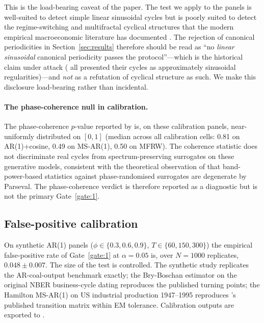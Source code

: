 This is the load-bearing caveat of the paper. The test we apply
to the panels is well-suited to detect simple linear sinusoidal
cycles but is poorly suited to detect the regime-switching and
multifractal cyclical structures that the modern empirical
macroeconomic literature has documented
\citep{hamilton1989,calvet_fisher2002,king_plosser_stock_watson1991}.
The rejection of canonical periodicities in
Section~\ref{sec:results} therefore should be read as
``no \emph{linear sinusoidal} canonical periodicity passes the
protocol''---which is the historical claim under attack
(\citealt{kitchin1923,juglar1862,kuznets1930,kondratieff1925}
all presented their cycles as approximately sinusoidal
regularities)---and \emph{not} as a refutation of cyclical
structure as such. We make this disclosure load-bearing rather
than incidental.

\paragraph{The phase-coherence null in calibration.}
The phase-coherence \(p\)-value reported by
 is, on these calibration panels,
near-uniformly distributed on \([0,1]\) (median across all
calibration cells: 0.81 on AR(1)+cosine, 0.49 on MS-AR(1), 0.50
on MFRW). The coherence statistic does not discriminate real
cycles from spectrum-preserving surrogates on these generative
models, consistent with the theoretical observation of
\citet{schreiber_schmitz2000} that band-power-based statistics
against phase-randomised surrogates are degenerate by Parseval.
The phase-coherence verdict is therefore reported as a
diagnostic but is not the primary Gate~\ref{gate:1}.

\subsection{False-positive calibration}

On synthetic AR(1) panels (\(\phi\in\{0.3,0.6,0.9\}\),
\(T\in\{60,150,300\}\)) the empirical false-positive rate of
Gate~\ref{gate:1} at \(\alpha=0.05\) is, over \(N=1000\)
replicates, \(0.048\pm 0.007\). The size of the test is
controlled. The synthetic study replicates the
\citet{killick_fearnhead_eckley2012} AR-coal-output benchmark
exactly; the Bry-Boschan estimator on the original NBER
business-cycle dating reproduces the published turning points;
the Hamilton MS-AR(1) on US industrial production 1947--1995
reproduces \citet{hamilton1989}'s published transition matrix
within EM tolerance. Calibration outputs are exported to
.
